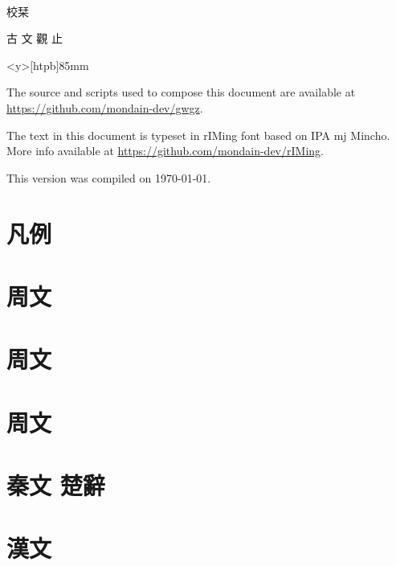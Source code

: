 \documentclass[openany,a5paper]{utbook}
\begin{document}
\thispagestyle{empty}
~\vfill{\it{\Large\parbox{1zw}{校栞}}\quad\Huge 古 文 觀 止\par}\vfill
\newpage\thispagestyle{empty}
\begin{minipage}<y>[htpb]{85mm}
\vspace{12cm}
{\centering \footnotesize The source and scripts used to compose this document are available at \url{https://github.com/mondain-dev/gwgz}. 

The text in this document is typeset in rIMing font based on IPA mj Mincho. More info available at \url{https://github.com/mondain-dev/rIMing}. 

This version was compiled on \today.\par
}
\end{minipage}

\frontmatter
\renewcommand\thepage{\rensuji{\roman{page}}\relax}
\begin{multicols}{2}
\tableofcontents
\end{multicols}

\chapter{凡例}

\mainmatter
\renewcommand\thepage{\zhdigits{\arabic{page}}\relax}
\chapter[{\small 周文}]{周文}


\chapter[{\small 周文}]{周文}


\chapter[{\small 周文}]{周文}


\chapter[{\small 秦文 楚辭}]{秦文 楚辭}


\chapter[{\small 漢文}]{漢文}

\end{document}
